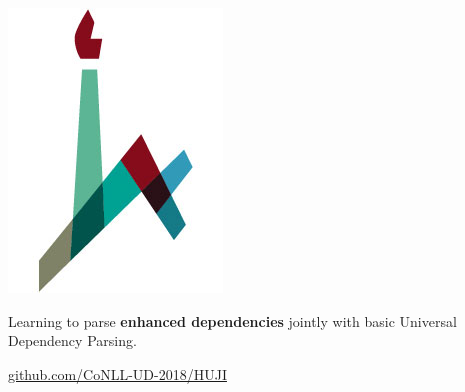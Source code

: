 \documentclass[a0,portrait]{a0poster}
\begin{document}
\begin{minipage}[b]{.07\linewidth}
\includegraphics[width=\linewidth]{huji_logo.jpg}
\end{minipage}

\vspace{1cm}
\titlespacing*{\section}{0pt}{8mm}{5mm}



\begin{adjustbox}{margin=5mm,frame,minipage=.71\linewidth,center}
\Large\color{Navy}
Learning to parse \textbf{enhanced dependencies} jointly with basic Universal Dependency Parsing.
\end{adjustbox}

\begin{center}
\url{github.com/CoNLL-UD-2018/HUJI}
\end{center}
\end{document}
